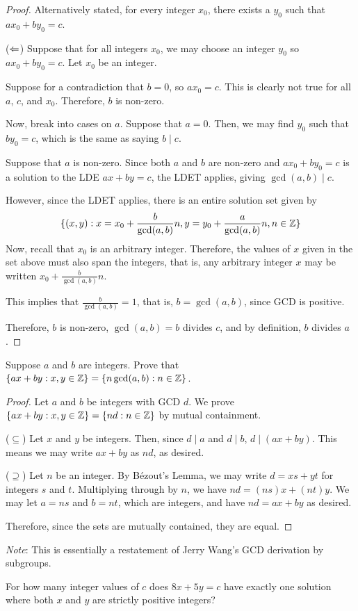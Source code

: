 \documentclass{agony}
\begin{document}
\begin{enumerate}[(a)]
\begin{proof}
          Alternatively stated, for every integer $x_0$, there exists a $y_0$ such that $ax_0+by_0=c$.

          ($\Leftarrow$) Suppose that for all integers $x_0$, we may choose an integer $y_0$ so $ax_0+by_0=c$.
          Let $x_0$ be an integer.

          Suppose for a contradiction that $b=0$, so $ax_0=c$.
          This is clearly not true for all $a$, $c$, and $x_0$.
          Therefore, $b$ is non-zero.
          
          Now, break into cases on $a$.
          Suppose that $a=0$. 
          Then, we may find $y_0$ such that $by_0=c$, which is the same as saying $b \mid c$.

          Suppose that $a$ is non-zero.
          Since both $a$ and $b$ are non-zero and $ax_0+by_0=c$ is a solution to the LDE $ax+by=c$,
          the LDET applies, giving $\gcd(a,b) \mid c$.

          However, since the LDET applies, there is an entire solution set given by
          \begin{equation*}
            \{(x,y) : x=x_0+\frac{b}{\gcd(a,b)}n, y=y_0+\frac{a}{\gcd(a,b)}n, n\in\mathbb{Z}\}
          \end{equation*}
          Now, recall that $x_0$ is an arbitrary integer.
          Therefore, the values of $x$ given in the set above must also span the integers, that is,
          any arbitrary integer $x$ may be written $x_0+\frac{b}{\gcd(a,b)}n$.

          This implies that $\frac{b}{\gcd(a,b)}=1$, that is, $b=\gcd(a,b)$, since GCD is positive.

          Therefore, $b$ is non-zero, $\gcd(a,b)=b$ divides $c$, and by definition, $b$ divides $a$.
        \end{proof}
\end{enumerate}


\question Suppose $a$ and $b$ are integers.
Prove that $\{ax+by : x,y\in\mathbb{Z}\} = {\{n\gcd(a,b) : n\in\mathbb{Z}\}}$.
\begin{proof}
  Let $a$ and $b$ be integers with GCD $d$.
  We prove $\{ax+by : x,y\in\mathbb{Z}\}=\{nd : n\in\mathbb{Z}\}$ by mutual containment.

  ($\subseteq$) Let $x$ and $y$ be integers.
  Then, since $d \mid a$ and $d \mid b$, $d \mid (ax+by)$.
  This means we may write $ax+by$ as $nd$, as desired.

  ($\supseteq$) Let $n$ be an integer.
  By Bézout's Lemma, we may write $d=xs+yt$ for integers $s$ and $t$.
  Multiplying through by $n$, we have $nd=(ns)x+(nt)y$.
  We may let $a=ns$ and $b=nt$, which are integers, and have $nd=ax+by$ as desired.

  Therefore, since the sets are mutually contained, they are equal.
\end{proof}

\emph{Note}: This is essentially a restatement of Jerry Wang's GCD derivation by subgroups.



\question For how many integer values of $c$ does $8x+5y=c$ have exactly one solution
where both $x$ and $y$ are strictly positive integers?
\end{document}

